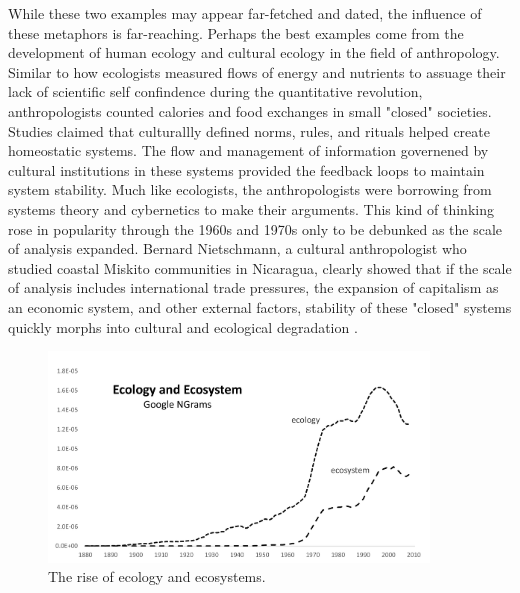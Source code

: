 While these two examples may appear far-fetched and dated, the influence of these metaphors is far-reaching. Perhaps the best examples come from the development of human ecology and cultural ecology in the field of anthropology. Similar to how ecologists measured flows of energy and nutrients to assuage their lack of scientific self confindence during the quantitative revolution, anthropologists counted calories and food exchanges in small "closed" societies. Studies claimed that culturallly defined norms, rules, and rituals helped create homeostatic systems. The flow and management of information governened by cultural institutions in these systems provided the feedback loops to maintain system stability. Much like ecologists, the anthropologists were borrowing from systems theory and cybernetics to make their arguments. This kind of thinking rose in popularity through the 1960s and 1970s only to be debunked as the scale of analysis expanded. Bernard Nietschmann, a cultural anthropologist who studied coastal Miskito communities in Nicaragua, clearly showed that if the scale of analysis includes international trade pressures, the expansion of capitalism as an economic system, and other external factors, stability of these "closed" systems quickly morphs into cultural and ecological degradation \citep{nietschmannn_1973}.

\begin{figure}[!ht]
  \centering
    \includegraphics[width=0.9\textwidth]{figures/ecologyEcosystem}
  \caption{The rise of ecology and ecosystems.}
\end{figure} 

